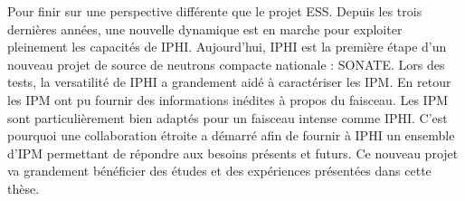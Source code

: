 Pour finir sur une perspective différente que le projet ESS. Depuis les trois dernières années, une nouvelle dynamique est en marche pour exploiter pleinement les capacités de IPHI. Aujourd'hui, IPHI est la première étape d'un nouveau projet de source de neutrons compacte nationale : SONATE.
Lors des tests, la versatilité de IPHI a grandement aidé à caractériser les IPM. En retour les IPM ont pu fournir des informations inédites à propos du faisceau. Les IPM sont particulièrement bien adaptés pour un faisceau intense comme IPHI. C'est pourquoi une collaboration étroite a démarré afin de fournir à IPHI un ensemble d'IPM permettant de répondre aux besoins présents et futurs. Ce nouveau projet va grandement bénéficier des études et des expériences présentées dans cette thèse.